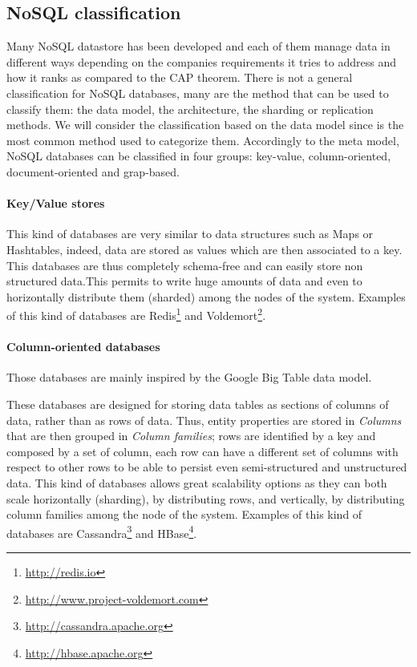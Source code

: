 \subsection{NoSQL classification}
Many NoSQL datastore has been developed and each of them manage data in different ways depending on the companies requirements it tries to address and how it ranks as compared to the CAP theorem.
There is not a general classification for NoSQL databases, many are the method that can be used to classify them: the data model, the architecture, the sharding or replication methods. We will consider the classification based on the data model since is the most common method used to categorize them.
Accordingly to the meta model, NoSQL databases can be classified in four groups: key-value, column-oriented, document-oriented and grap-based.

\paragraph{Key/Value stores} 
This kind of databases are very similar to data structures such as Maps or Hashtables, indeed, data are stored as values which are then associated to a key. This databases are thus completely schema-free and can easily store non structured data.This permits to write huge amounts of data and even to horizontally distribute them (sharded) among the nodes of the system.
Examples of this kind of databases are Redis\footnote{\url{http://redis.io}} and Voldemort\footnote{\url{http://www.project-voldemort.com}}.

\paragraph{Column-oriented databases}
Those databases are mainly inspired by the Google Big Table \cite{paper:bigtable} data model.

\noindent These databases are designed for storing data tables as sections of columns of data, rather than as rows of data. Thus, entity properties are stored in \textit{Columns} that are then grouped in \textit{Column families}; rows are identified by a key and composed by a set of column, each row can have a different set of columns with respect to other rows to be able to persist even semi-structured and unstructured data.
This kind of databases allows great scalability options as they can both scale horizontally (sharding), by distributing rows, and vertically, by distributing column families among the node of the system.
\noindent Examples of this kind of databases are Cassandra\footnote{\url{http://cassandra.apache.org}} and HBase\footnote{\url{http://hbase.apache.org}}.

